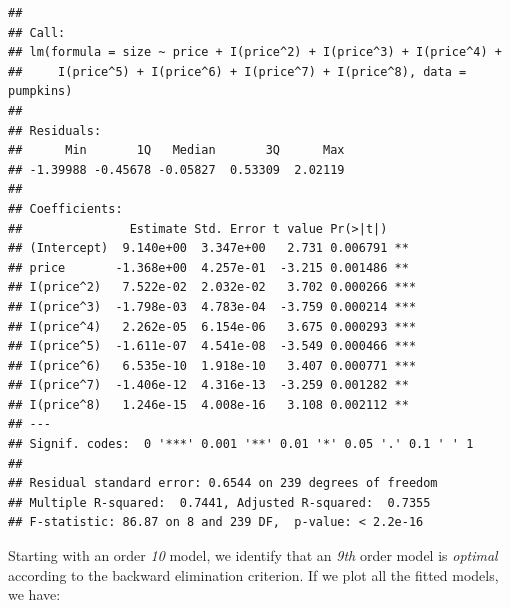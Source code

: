 \documentclass[
]{book}
\begin{document}
\begin{verbatim}
## 
## Call:
## lm(formula = size ~ price + I(price^2) + I(price^3) + I(price^4) + 
##     I(price^5) + I(price^6) + I(price^7) + I(price^8), data = pumpkins)
## 
## Residuals:
##      Min       1Q   Median       3Q      Max 
## -1.39988 -0.45678 -0.05827  0.53309  2.02119 
## 
## Coefficients:
##               Estimate Std. Error t value Pr(>|t|)    
## (Intercept)  9.140e+00  3.347e+00   2.731 0.006791 ** 
## price       -1.368e+00  4.257e-01  -3.215 0.001486 ** 
## I(price^2)   7.522e-02  2.032e-02   3.702 0.000266 ***
## I(price^3)  -1.798e-03  4.783e-04  -3.759 0.000214 ***
## I(price^4)   2.262e-05  6.154e-06   3.675 0.000293 ***
## I(price^5)  -1.611e-07  4.541e-08  -3.549 0.000466 ***
## I(price^6)   6.535e-10  1.918e-10   3.407 0.000771 ***
## I(price^7)  -1.406e-12  4.316e-13  -3.259 0.001282 ** 
## I(price^8)   1.246e-15  4.008e-16   3.108 0.002112 ** 
## ---
## Signif. codes:  0 '***' 0.001 '**' 0.01 '*' 0.05 '.' 0.1 ' ' 1
## 
## Residual standard error: 0.6544 on 239 degrees of freedom
## Multiple R-squared:  0.7441, Adjusted R-squared:  0.7355 
## F-statistic: 86.87 on 8 and 239 DF,  p-value: < 2.2e-16
\end{verbatim}

Starting with an order \emph{10} model, we identify that an \emph{9th} order model is \emph{optimal} according to the backward elimination criterion. If we plot all the fitted models, we have:
\end{document}
